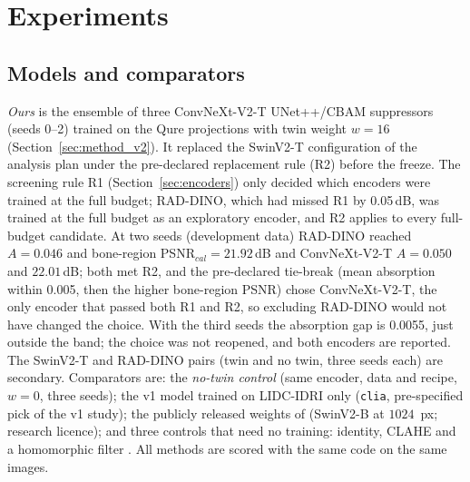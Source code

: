 \section{Experiments}
\label{sec:experiments}
\subsection{Models and comparators}
\emph{Ours} is the ensemble of three ConvNeXt-V2-T UNet++/CBAM suppressors (seeds 0--2) trained on the Qure projections with twin weight $w=16$
(Section~\ref{sec:method_v2}). It replaced the SwinV2-T configuration of the analysis plan under the pre-declared replacement rule (R2) before the
freeze. The screening rule R1 (Section~\ref{sec:encoders}) only decided which encoders were trained at the full budget; RAD-DINO, which had
missed R1 by 0.05\,dB, was trained at the full budget as an exploratory encoder, and R2 applies to every full-budget candidate. At two seeds
(development data) RAD-DINO reached $A=0.046$ and bone-region PSNR$_{cal}=21.92$\,dB and ConvNeXt-V2-T $A=0.050$ and $22.01$\,dB; both met
R2, and the pre-declared tie-break (mean absorption within 0.005, then the higher bone-region PSNR) chose ConvNeXt-V2-T, the only encoder that
passed both R1 and R2, so excluding RAD-DINO would not have changed the choice. With the third seeds the absorption gap is 0.0055, just outside
the band; the choice was not reopened, and both encoders are reported. The SwinV2-T and RAD-DINO pairs (twin and no twin, three seeds each) are secondary.
Comparators are: the \emph{no-twin control} (same encoder, data and recipe, $w=0$, three seeds); the v1 model trained on LIDC-IDRI only (\texttt{clia},
pre-specified pick of the v1 study); the publicly released weights of \citet{angaitkar2026anatomy} (SwinV2-B at $1024$~px; research licence);
and three controls that need no training: identity, CLAHE \citep{zuiderveld1994clahe} and a homomorphic filter
\citep{oppenheim1968homomorphic}. All methods are scored with the same code on the same images.

